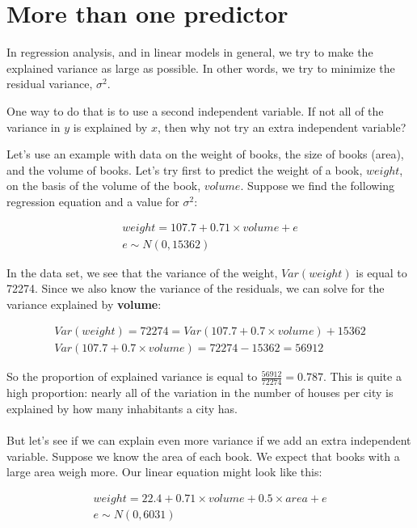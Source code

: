 \documentclass[]{book}\usepackage[]{graphicx}\usepackage[]{color}
\begin{document}
\section{More than one predictor}

In regression analysis, and in linear models in general, we try to make the explained variance as large as possible. In other words, we try to minimize the residual variance, $\sigma^2$.

One way to do that is to use a second independent variable. If not all of the variance in $y$ is explained by $x$, then why not try an extra independent variable?


Let's use an example with data on the weight of books, the size of books (area), and the volume of books. Let's try first to predict the weight of a book, $weight$, on the basis of the volume of the book, $volume$. Suppose we find the following regression equation and a value for $\sigma^2$:






\begin{eqnarray}
weight = 107.7 + 0.71 \times  volume + e \\
e \sim N(0, 15362)
\end{eqnarray}


In the data set, we see that the variance of the weight, $Var(weight)$ is equal to 72274. Since we also know the variance of the residuals, we can solve for the variance explained by \textbf{volume}:


\begin{eqnarray}
Var(weight) =  72274=   Var(107.7 + 0.7 \times  volume) + 15362 \nonumber\\
Var(107.7 + 0.7 \times  volume) = 72274- 15362= 56912\nonumber
\end{eqnarray}

So the proportion of explained variance is equal to $ \frac{56912}{72274}=0.787$. This is quite a high proportion: nearly all of the variation in the number of houses per city is explained by how many inhabitants a city has.
\\
\\
But let's see if we can explain even more variance if we add an extra independent variable. Suppose we know the area of each book. We expect that books with a large area weigh more. Our linear equation might look like this:


\begin{eqnarray}
weight = 22.4 + 0.71 \times volume + 0.5 \times  area + e \\
e \sim N(0, 6031)
\end{eqnarray}
\end{document}
